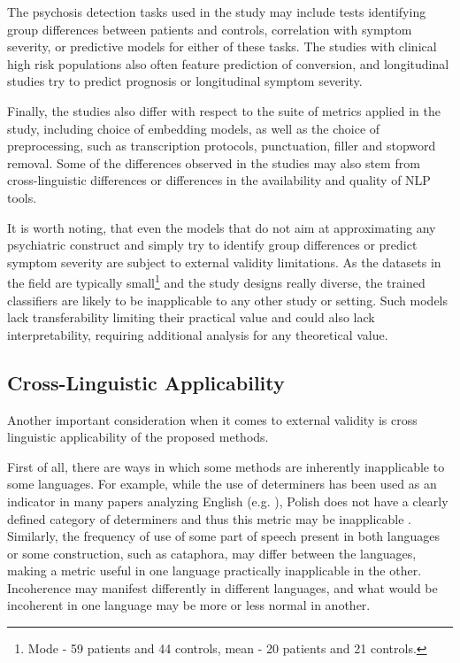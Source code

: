 The psychosis detection tasks used in the study may include tests identifying group differences between patients and controls, correlation with symptom severity, or predictive models for either of these tasks. The studies with clinical high risk populations also often feature prediction of conversion, and longitudinal studies try to predict prognosis or longitudinal symptom severity.

Finally, the studies also differ with respect to the suite of metrics applied in the study, including choice of embedding models, as well as the choice of preprocessing, such as transcription protocols, punctuation, filler and stopword removal. Some of the differences observed in the studies may also stem from cross-linguistic differences or differences in the availability and quality of NLP tools.

It is worth noting, that even the models that do not aim at approximating any psychiatric construct and simply try to identify group differences or predict symptom severity are subject to external validity limitations. As the datasets in the field are typically small\footnote{Mode - 59 patients and 44 controls, mean - 20 patients and 21 controls.} %
and the study designs really diverse, the trained classifiers are likely to be inapplicable to any other study or setting. Such models lack transferability limiting their practical value and could also lack interpretability, requiring additional analysis for any theoretical value. 

\subsection{Cross-Linguistic Applicability}
\label{sec:intro:cross-linguitic-applicability}

Another important consideration when it comes to external validity is cross linguistic applicability of the proposed methods. 

First of all, there are ways in which some methods are inherently inapplicable to some languages. For example, while the use of determiners has been used as an indicator in many papers analyzing English (e.g. \cite{bedi2015automated, tang2021natural, bilgrami2022construct}), Polish does not have a clearly defined category of determiners and thus this metric may be inapplicable \citep{sarzynska2021detecting}. Similarly, the frequency of use of some part of speech present in both languages or some construction, such as cataphora, may differ between the languages, making a metric useful in one language practically inapplicable in the other. Incoherence may manifest differently in different languages, and what would be incoherent in one language may be more or less normal in another.

